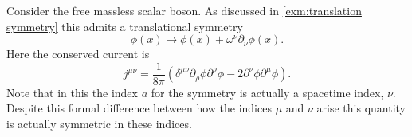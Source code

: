 \documentclass[fleqn]{NotesClass}
\begin{document}
    \begin{exm}{}{}
        Consider the free massless scalar boson.
        As discussed in \cref{exm:translation symmetry} this admits a translational symmetry
        \begin{equation}
            \phi(x) \mapsto \phi(x) + \omega^\nu \partial_\nu \phi(x).
        \end{equation}
        Here the conserved current is
        \begin{equation}
            j^{\mu\nu} = \frac{1}{8\pi} (\delta^{\mu\nu} \partial_\rho \phi \partial^\rho \phi - 2\partial^\nu \phi \partial^\mu \phi).
        \end{equation}
        Note that in this the index \(a\) for the symmetry is actually a spacetime index, \(\nu\).
        Despite this formal difference between how the indices \(\mu\) and \(\nu\) arise this quantity is actually symmetric in these indices.
        

\end{exm}
\end{document}
